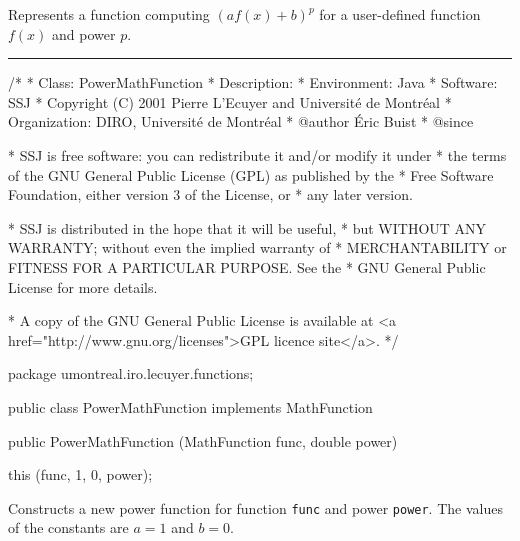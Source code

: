 
Represents a function computing $(af(x) + b)^p$ for a user-defined function
$f(x)$ and power $p$.

\bigskip\hrule

\begin{code}
\begin{hide}
/*
 * Class:        PowerMathFunction
 * Description:  
 * Environment:  Java
 * Software:     SSJ 
 * Copyright (C) 2001  Pierre L'Ecuyer and Université de Montréal
 * Organization: DIRO, Université de Montréal
 * @author       Éric Buist
 * @since

 * SSJ is free software: you can redistribute it and/or modify it under
 * the terms of the GNU General Public License (GPL) as published by the
 * Free Software Foundation, either version 3 of the License, or
 * any later version.

 * SSJ is distributed in the hope that it will be useful,
 * but WITHOUT ANY WARRANTY; without even the implied warranty of
 * MERCHANTABILITY or FITNESS FOR A PARTICULAR PURPOSE.  See the
 * GNU General Public License for more details.

 * A copy of the GNU General Public License is available at
   <a href="http://www.gnu.org/licenses">GPL licence site</a>.
 */
\end{hide}
package umontreal.iro.lecuyer.functions;\begin{hide}

\end{hide}

public class PowerMathFunction implements MathFunction\begin{hide}

,
      MathFunctionWithFirstDerivative {
   private MathFunction func;
   private double a, b;
   private double power;
\end{hide}

   public PowerMathFunction (MathFunction func, double power)\begin{hide} {
      this (func, 1, 0, power);
   }\end{hide}
\end{code}
\begin{tabb}   Constructs a new power function for function \texttt{func} and power
 \texttt{power}. The values of the constants are $a=1$ and $b=0$.
\end{tabb}
\begin{htmlonly}
\end{htmlonly}
